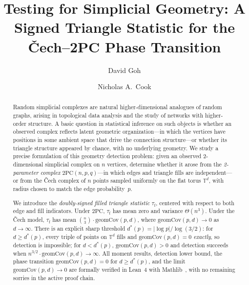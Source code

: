 \documentclass[reqno,12pt]{amsart}
\newcommand{\tauf}{\tau_{\mathrm{f}}}
\newcommand{\PC}{\mathrm{2PC}}
\newcommand{\geomCov}{\mathrm{geomCov}}
\newcommand{\TT}{\mathbb{T}}         %
\theoremstyle{plain}
\theoremstyle{definition}
\theoremstyle{remark}
\begin{document}
\title[Testing for Simplicial Geometry]{Testing for Simplicial Geometry: A Signed Triangle
  Statistic for the \v{C}ech--2PC Phase Transition}

\author{David Goh}
\address{Department of Computer Science, University of Toronto}

\author{Nicholas A.\ Cook}
\address{Department of Mathematics, Duke University}

\date{}



\begin{abstract}
Random simplicial complexes are natural higher-dimensional analogues of random graphs, arising
in topological data analysis and the study of networks with higher-order structure. A basic
question in statistical inference on such objects is whether an observed complex reflects
latent geometric organization---in which the vertices have positions in some ambient space
that drive the connection structure---or whether its triangle structure appeared by chance,
with no underlying geometry. We study a precise formulation of this geometry detection
problem: given an observed 2-dimensional simplicial complex on $n$ vertices, determine whether
it arose from the \emph{2-parameter complex} $\PC(n,p,q)$---in which edges and triangle fills
are independent---or from the \v{C}ech complex of $n$ points sampled uniformly on the flat
torus $\TT^d$, with radius chosen to match the edge probability~$p$.

We introduce the \emph{doubly-signed filled triangle statistic} $\tauf$, centered with respect
to both edge and fill indicators. Under $\PC$, $\tauf$ has mean zero and variance $\Theta(n^3)$.
Under the \v{C}ech model, $\tauf$ has mean $\binom{n}{3}\cdot\geomCov(p,d)$, where
$\geomCov(p,d)\to 0$ as $d\to\infty$. There is an explicit sharp threshold
$d^*(p) = |\log p|/\log(3/2)$: for $d \geq d^*(p)$, every triple of points on $\TT^d$ fills
and $\geomCov(p,d) = 0$ \emph{exactly}, so detection is impossible; for $d < d^*(p)$,
$\geomCov(p,d) > 0$ and detection succeeds when $n^{3/2}\cdot\geomCov(p,d)\to\infty$.
All moment results, detection lower bound, the phase transition $\geomCov(p,d)=0$ for $d\geq d^*(p)$,
and the limit $\geomCov(p,d)\to 0$ are formally verified in Lean~4 with
Mathlib~\cite{Mathlib2020}, with no remaining sorries in the active proof chain.
\end{abstract}
\end{document}
